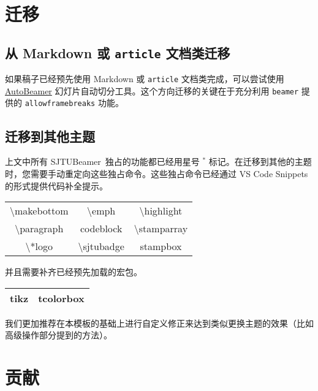 \documentclass[
    UTF8,
    heading=true,
    12pt,
    a4paper
]{ctexrep}
\def\themename{\textsf{SJTUBeamer}}
\begin{document}
\chapter{迁移}

\section{从 Markdown 或 \texttt{article} 文档类迁移}

如果稿子已经预先使用 Markdown 或 \texttt{article} 文档类完成，可以尝试使用 \href{https://logcreative.github.io/AutoBeamer/}{AutoBeamer} 幻灯片自动切分工具。这个方向迁移的关键在于充分利用 \texttt{beamer} 提供的 \texttt{allowframebreaks} 功能。

\section{迁移到其他主题}

上文中所有 \themename\ 独占的功能都已经用星号 $^*$ 标记。在迁移到其他的主题时，您需要手动重定向这些独占命令。这些独占命令已经通过 VS Code Snippets 的形式提供代码补全提示。

\begin{table}[h]
  \centering
  \begin{tabular}{>{\ttfamily}c>{\ttfamily}c>{\ttfamily}c}
    \hline
    \textbackslash{}makebottom & \textbackslash{}emph      & \textbackslash{}highlight  \\
    \textbackslash{}paragraph  & codeblock                 & \textbackslash{}stamparray \\
    \textbackslash{}*logo      & \textbackslash{}sjtubadge & stampbox                   \\
    \hline
  \end{tabular}
\end{table}

并且需要补齐已经预先加载的宏包。

\begin{table}[h]
  \centering
  \begin{tabular}{>{\sffamily}c>{\sffamily}c}
    \hline
    tikz & tcolorbox \\
    \hline
  \end{tabular}
\end{table}

我们更加推荐在本模板的基础上进行自定义修正来达到类似更换主题的效果（比如高级操作部分提到的方法）。


\chapter{贡献}
\end{document}
